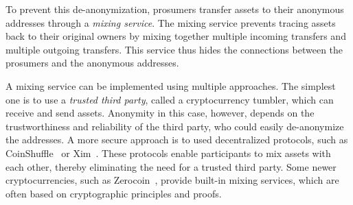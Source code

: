 To prevent this de-anonymization, prosumers transfer assets to their
anonymous addresses through a \emph{mixing service}.  The mixing
service prevents tracing assets back to their original owners by
mixing together multiple incoming transfers and multiple outgoing
transfers. This service thus hides the connections between the
prosumers and the anonymous addresses.

A mixing service can be implemented using multiple approaches.  The
simplest one is to use a \emph{trusted third party}, called a
cryptocurrency tumbler, which can receive and send assets.  Anonymity
in this case, however, depends on the trustworthiness and reliability
of the third party, who could easily de-anonymize the addresses.  A
more secure approach is to used decentralized protocols, such as
CoinShuffle~\cite{ruffing2014coinshuffle} or
Xim~\cite{bissias2014sybil}.  These protocols enable participants to
mix assets with each other, thereby eliminating the need for a trusted
third party.
Some newer cryptocurrencies, such as
Zerocoin~\cite{miers2013zerocoin}, provide built-in mixing services,
which are often based on cryptographic principles and proofs.

